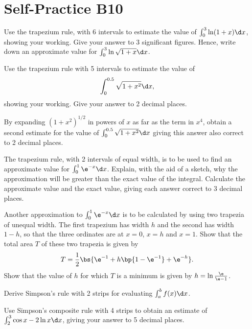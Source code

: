 \section{Self-Practice B10}

\begin{problem}
    Use the trapezium rule, with 6 intervals to estimate the value of $\int_{0}^{3}\ln(1+x) \d x$, showing your working. Give your answer to 3 significant figures. Hence, write down an approximate value for $\int_{0}^{3}\ln\sqrt{1+x} \d x$.
\end{problem}

\begin{problem}
    Use the trapezium rule with 5 intervals to estimate the value of \[\int_{0}^{0.5}\sqrt{1+x^{2}} \d x,\] showing your working. Give your answer to 2 decimal places.

    By expanding $(1+x^{2})^{1/2}$ in powers of $x$ as far as the term in $x^{4}$, obtain a second estimate for the value of $\int_{0}^{0.5}\sqrt{1+x^{2}} \d x$ giving this answer also correct to 2 decimal places.
\end{problem}

\begin{problem}
    The trapezium rule, with 2 intervals of equal width, is to be used to find an approximate value for $\int_{0}^{1}\e^{-x} \d x$. Explain, with the aid of a sketch, why the approximation will be greater than the exact value of the integral. Calculate the approximate value and the exact value, giving each answer correct to 3 decimal places.

    Another approximation to $\int_{0}^{1}\e^{-x} \d x$ is to be calculated by using two trapezia of unequal width. The first trapezium has width $h$ and the second has width $1-h$, so that the three ordinates are at $x=0$, $x=h$ and $x=1$. Show that the total area $T$ of these two trapezia is given by \[T = \frac12 \bs{\e^{-1} + h \bp{1 - \e^{-1}} + \e^{-h}}.\] Show that the value of $h$ for which $T$ is a minimum is given by $h=\ln \frac{\e}{\e - 1}$. 
\end{problem}

\begin{problem}
    Derive Simpson's rule with 2 strips for evaluating $\int_{a}^{b} f(x) \d x$. 
    
    Use Simpson's composite rule with 4 strips to obtain an estimate of $\int_{2}^{3} \cos{x - 2} \ln x \d x$, giving your answer to 5 decimal places.
\end{problem}

